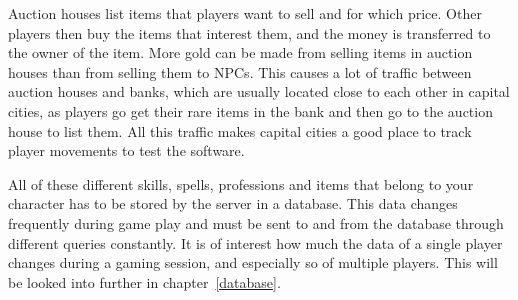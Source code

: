 Auction houses list items that players want to sell and for which price. Other players then buy the items that interest them, and the money is transferred to the owner of the item. More gold can be made from selling items in auction houses than from selling them to NPCs. This causes a lot of traffic between auction houses and banks, which are usually located close to each other in capital cities, as players go get their rare items in the bank and then go to the auction house to list them. All this traffic makes capital cities a good place to track player movements to test the software.

All of these different skills, spells, professions and items that belong to your character has to be stored by the server in a database. This data changes frequently during game play and must be sent to and from the database through different queries constantly. It is of interest how much the data of a single player changes during a gaming session, and especially so of multiple players. This will be looked into further in chapter~\ref{database}.

